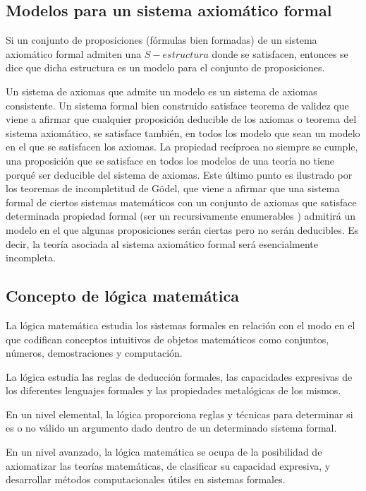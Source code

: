 \subsection{Modelos para un sistema axiomático formal}

Si un conjunto de proposiciones (fórmulas bien formadas) de un sistema
axiomático formal admiten una $S-estructura$ donde se satisfacen,
entonces se dice que dicha estructura es un modelo para el conjunto
de proposiciones.

Un sistema de axiomas que admite un modelo es un sistema de axiomas
consistente. Un sistema formal bien construido satisface \textquotedbl{}teorema
de validez\textquotedbl{} que viene a afirmar que cualquier proposición
deducible de los axiomas o teorema del sistema axiomático, se satisface
también, en todos los modelo que sean un modelo en el que se satisfacen
los axiomas. La propiedad recíproca no siempre se cumple, una proposición
que se satisface en todos los modelos de una teoría no tiene porqué
ser deducible del sistema de axiomas. Este último punto es ilustrado
por los teoremas de incompletitud de Gödel, que viene a afirmar que
una sistema formal de ciertos sistemas matemáticos con un conjunto
de axiomas que satisface determinada propiedad formal (ser un recursivamente
enumerables ) admitirá un modelo en el que algunas proposiciones serán
ciertas pero no serán deducibles. Es decir, la teoría asociada al
sistema axiomático formal será esencialmente incompleta. 


\subsection{Concepto de lógica matemática}

La lógica matemática estudia los sistemas formales en relación con
el modo en el que codifican conceptos intuitivos de objetos matemáticos
como conjuntos, números, demostraciones y computación. 

La lógica estudia las reglas de deducción formales, las capacidades
expresivas de los diferentes lenguajes formales y las propiedades
metalógicas de los mismos. 

En un nivel elemental, la lógica proporciona reglas y técnicas para
determinar si es o no válido un argumento dado dentro de un determinado
sistema formal. 

En un nivel avanzado, la lógica matemática se ocupa de la posibilidad
de axiomatizar las teorías matemáticas, de clasificar su capacidad
expresiva, y desarrollar métodos computacionales útiles en sistemas
formales.


